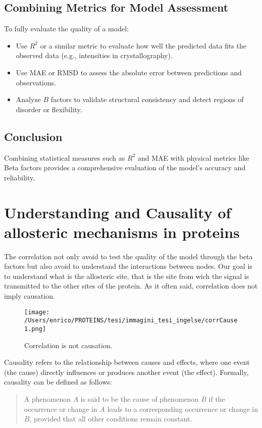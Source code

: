 \documentclass[English, Lau, oneside]{sapthesis}
\begin{document}
\begin{itemize}
\subsection*{Combining Metrics for Model Assessment}
To fully evaluate the quality of a model:
\begin{itemize}
    \item Use \(R^2\) or a similar metric to evaluate how well the predicted data fits the observed data (e.g., intensities in crystallography).
    \item Use MAE or RMSD to assess the absolute error between predictions and observations.
    \item Analyze \(B\) factors to validate structural consistency and detect regions of disorder or flexibility.
\end{itemize}







\subsection*{Conclusion}
Combining statistical measures such as \(R^2\) and MAE with physical metrics like Beta factors provides a comprehensive evaluation of the model's accuracy and reliability.

\section{Understanding and Causality of allosteric mechanisms in proteins}
The correlation not only avoid to test the quality of the model through the beta factors but also avoid to understand the interactions between nodes.
Our goal is to understand what is the allosteric site, that is the site from wich the signal is transmitted to the other sites of the protein. 
As it often said, correlation does not imply causation.
\begin{figure}[h]
    \centering
    \texttt{[image: /Users/enrico/PROTEINS/tesi/immagini\_tesi\_ingelse/corrCause1.png]}    
    \caption{Correlation is not causation.}
    \label{fig:Correlation is not causation}
\end{figure}
Causality refers to the relationship between causes and effects, where one event (the cause) directly influences or produces another event (the effect). Formally, causality can be defined as follows:

\begin{quote}
    A phenomenon \( A \) is said to be the cause of phenomenon \( B \) if the occurrence or change in \( A \) leads to a corresponding occurrence or change in \( B \), provided that all other conditions remain constant.
\end{quote}


\end{itemize}
\end{document}
